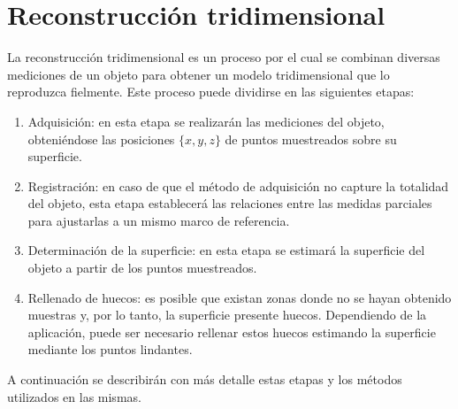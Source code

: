 \chapter{Reconstrucción tridimensional}

La reconstrucción tridimensional es un proceso por el cual se combinan diversas mediciones de un objeto
para obtener un modelo tridimensional que lo reproduzca fielmente.
Este proceso puede dividirse en las siguientes etapas:
\begin{enumerate}
	\item Adquisición: en esta etapa se realizarán las mediciones del objeto,
		obteniéndose las posiciones $\{x, y, z\}$ de puntos muestreados sobre su superficie.
	\item Registración: en caso de que el método de adquisición no capture la totalidad del objeto,
		esta etapa establecerá las relaciones entre las medidas parciales
		para ajustarlas a un mismo marco de referencia.
	\item Determinación de la superficie: en esta etapa se estimará la superficie del objeto
		a partir de los puntos muestreados.
	\item Rellenado de huecos: es posible que existan zonas donde
		no se hayan obtenido muestras y, por lo tanto, la superficie presente huecos.
		Dependiendo de la aplicación, puede ser necesario rellenar estos huecos
		estimando la superficie mediante los puntos lindantes.
\end{enumerate}

A continuación se describirán con más detalle estas etapas y los métodos utilizados en las mismas.






